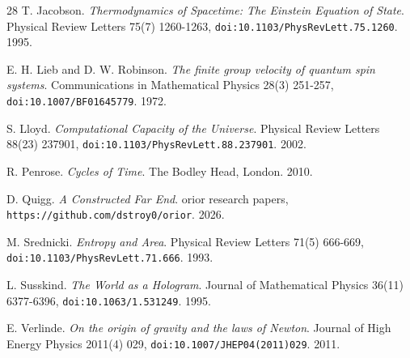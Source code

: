 \begin{thebibliography}{28}
T. Jacobson. \emph{Thermodynamics of Spacetime: The Einstein Equation of State}. Physical Review Letters 75(7) 1260-1263, \texttt{doi:10.1103/\allowbreak{}PhysRevLett.75.1260}. 1995.

E. H. Lieb and D. W. Robinson. \emph{The finite group velocity of quantum spin systems}. Communications in Mathematical Physics 28(3) 251-257, \texttt{doi:10.1007/\allowbreak{}BF01645779}. 1972.

S. Lloyd. \emph{Computational Capacity of the Universe}. Physical Review Letters 88(23) 237901, \texttt{doi:10.1103/\allowbreak{}PhysRevLett.88.237901}. 2002.

R. Penrose. \emph{Cycles of Time}. The Bodley Head, London. 2010.

D. Quigg. \emph{A Constructed Far End}. orior research papers, \texttt{https:/\allowbreak{}/\allowbreak{}github.com/\allowbreak{}dstroy0/\allowbreak{}orior}. 2026.

M. Srednicki. \emph{Entropy and Area}. Physical Review Letters 71(5) 666-669, \texttt{doi:10.1103/\allowbreak{}PhysRevLett.71.666}. 1993.

L. Susskind. \emph{The World as a Hologram}. Journal of Mathematical Physics 36(11) 6377-6396, \texttt{doi:10.1063/\allowbreak{}1.531249}. 1995.

E. Verlinde. \emph{On the origin of gravity and the laws of Newton}. Journal of High Energy Physics 2011(4) 029, \texttt{doi:10.1007/\allowbreak{}JHEP04(2011)029}. 2011.

\end{thebibliography}
